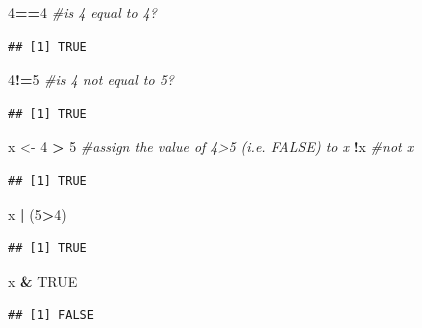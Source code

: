 \documentclass[]{article}
\newenvironment{Shaded}{\begin{snugshade}}{\end{snugshade}}
\newcommand{\DecValTok}[1]{\textcolor[rgb]{0.00,0.00,0.81}{#1}}
\newcommand{\StringTok}[1]{\textcolor[rgb]{0.31,0.60,0.02}{#1}}
\newcommand{\CommentTok}[1]{\textcolor[rgb]{0.56,0.35,0.01}{\textit{#1}}}
\newcommand{\OtherTok}[1]{\textcolor[rgb]{0.56,0.35,0.01}{#1}}
\newcommand{\OperatorTok}[1]{\textcolor[rgb]{0.81,0.36,0.00}{\textbf{#1}}}
\newcommand{\NormalTok}[1]{#1}
\begin{document}
\begin{Shaded}
\begin{Highlighting}[]
\DecValTok{4}\OperatorTok{==}\DecValTok{4} \CommentTok{#is 4 equal to 4? }
\end{Highlighting}
\end{Shaded}

\begin{verbatim}
## [1] TRUE
\end{verbatim}

\begin{Shaded}
\begin{Highlighting}[]
\DecValTok{4}\OperatorTok{!=}\DecValTok{5} \CommentTok{#is 4 not equal to 5?}
\end{Highlighting}
\end{Shaded}

\begin{verbatim}
## [1] TRUE
\end{verbatim}

\begin{Shaded}
\begin{Highlighting}[]
\NormalTok{x <-}\StringTok{ }\DecValTok{4} \OperatorTok{>}\StringTok{ }\DecValTok{5} \CommentTok{#assign the value of 4>5 (i.e. FALSE) to x}
\OperatorTok{!}\NormalTok{x }\CommentTok{#not x}
\end{Highlighting}
\end{Shaded}

\begin{verbatim}
## [1] TRUE
\end{verbatim}

\begin{Shaded}
\begin{Highlighting}[]
\NormalTok{x }\OperatorTok{|}\StringTok{ }\NormalTok{(}\DecValTok{5}\OperatorTok{>}\DecValTok{4}\NormalTok{)}
\end{Highlighting}
\end{Shaded}

\begin{verbatim}
## [1] TRUE
\end{verbatim}

\begin{Shaded}
\begin{Highlighting}[]
\NormalTok{x }\OperatorTok{&}\StringTok{ }\OtherTok{TRUE}
\end{Highlighting}
\end{Shaded}

\begin{verbatim}
## [1] FALSE
\end{verbatim}
\end{document}
